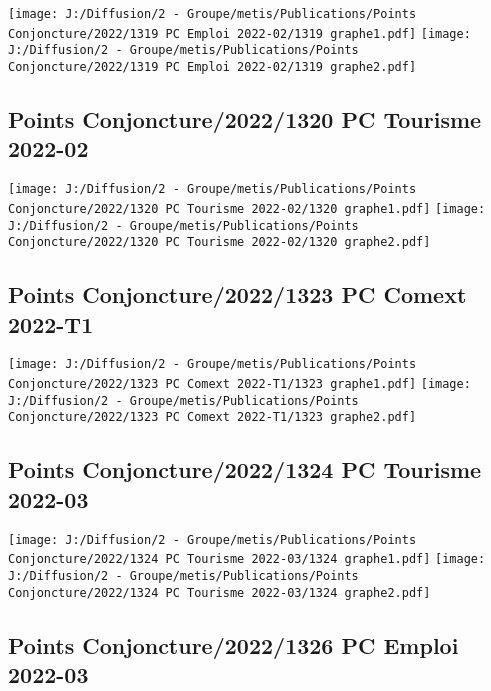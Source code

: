 \documentclass[
]{article}
\begin{document}
\texttt{[image: J:/Diffusion/2 - Groupe/metis/Publications/Points Conjoncture/2022/1319 PC Emploi 2022-02/1319 graphe1.pdf]}
\texttt{[image: J:/Diffusion/2 - Groupe/metis/Publications/Points Conjoncture/2022/1319 PC Emploi 2022-02/1319 graphe2.pdf]}

\hypertarget{points-conjoncture20221320-pc-tourisme-2022-02}{%
\subsection{Points Conjoncture/2022/1320 PC Tourisme
2022-02}\label{points-conjoncture20221320-pc-tourisme-2022-02}}

\texttt{[image: J:/Diffusion/2 - Groupe/metis/Publications/Points Conjoncture/2022/1320 PC Tourisme 2022-02/1320 graphe1.pdf]}
\texttt{[image: J:/Diffusion/2 - Groupe/metis/Publications/Points Conjoncture/2022/1320 PC Tourisme 2022-02/1320 graphe2.pdf]}

\hypertarget{points-conjoncture20221323-pc-comext-2022-t1}{%
\subsection{Points Conjoncture/2022/1323 PC Comext
2022-T1}\label{points-conjoncture20221323-pc-comext-2022-t1}}

\texttt{[image: J:/Diffusion/2 - Groupe/metis/Publications/Points Conjoncture/2022/1323 PC Comext 2022-T1/1323 graphe1.pdf]}
\texttt{[image: J:/Diffusion/2 - Groupe/metis/Publications/Points Conjoncture/2022/1323 PC Comext 2022-T1/1323 graphe2.pdf]}

\hypertarget{points-conjoncture20221324-pc-tourisme-2022-03}{%
\subsection{Points Conjoncture/2022/1324 PC Tourisme
2022-03}\label{points-conjoncture20221324-pc-tourisme-2022-03}}

\texttt{[image: J:/Diffusion/2 - Groupe/metis/Publications/Points Conjoncture/2022/1324 PC Tourisme 2022-03/1324 graphe1.pdf]}
\texttt{[image: J:/Diffusion/2 - Groupe/metis/Publications/Points Conjoncture/2022/1324 PC Tourisme 2022-03/1324 graphe2.pdf]}

\hypertarget{points-conjoncture20221326-pc-emploi-2022-03}{%
\subsection{Points Conjoncture/2022/1326 PC Emploi
2022-03}\label{points-conjoncture20221326-pc-emploi-2022-03}}
\end{document}
